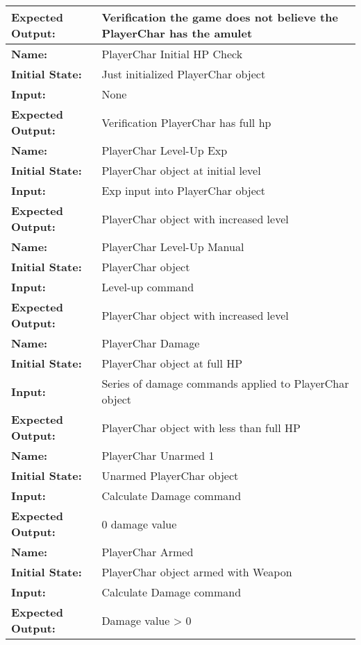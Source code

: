 \documentclass[12pt, titlepage]{article}
\begin{document}
\begin{center}
\begin{longtable}{ l | p{10cm} }
				\textbf{Expected Output:} & Verification the game does not believe the PlayerChar has the amulet\\[0.6em]
				\hline
				\rule{0pt}{1.5em}\textbf{Name:} & PlayerChar Initial HP Check\\
				\textbf{Initial State:} & Just initialized PlayerChar object\\
				\textbf{Input:} & None\\
				\textbf{Expected Output:} & Verification PlayerChar has full hp\\[0.6em]
				\hline
				\rule{0pt}{1.5em}\textbf{Name:} & PlayerChar Level-Up Exp\\
				\textbf{Initial State:} & PlayerChar object at initial level\\
				\textbf{Input:} & Exp input into PlayerChar object\\
				\textbf{Expected Output:} & PlayerChar object with increased level\\[0.6em]
				\hline
				\rule{0pt}{1.5em}\textbf{Name:} & PlayerChar Level-Up Manual\\
				\textbf{Initial State:} & PlayerChar object\\
				\textbf{Input:} & Level-up command\\
				\textbf{Expected Output:} & PlayerChar object with increased level\\[0.6em]
				\hline
				\rule{0pt}{1.5em}\textbf{Name:} & PlayerChar Damage\\
				\textbf{Initial State:} & PlayerChar object at full HP\\
				\textbf{Input:} & Series of damage commands applied to PlayerChar object\\
				\textbf{Expected Output:} & PlayerChar object with less than full HP\\[0.6em]
				\hline
				\rule{0pt}{1.5em}\textbf{Name:} & PlayerChar Unarmed 1\\
				\textbf{Initial State:} & Unarmed PlayerChar object\\
				\textbf{Input:} & Calculate Damage command\\
				\textbf{Expected Output:} & 0 damage value\\[0.6em]
				\hline
				\rule{0pt}{1.5em}\textbf{Name:} & PlayerChar Armed\\
				\textbf{Initial State:} & PlayerChar object armed with Weapon\\
				\textbf{Input:} & Calculate Damage command\\
				\textbf{Expected Output:} & Damage value > 0\\[0.6em]

\end{longtable}
\end{center}
\end{document}
